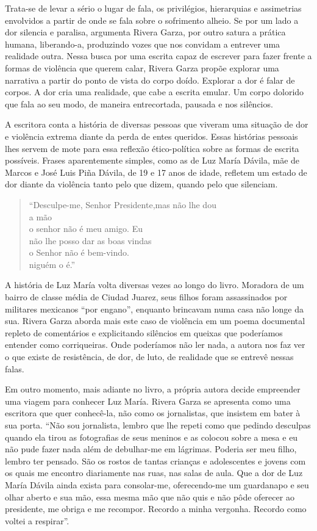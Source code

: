 Trata-se de levar a sério o lugar de fala, os privilégios, hierarquias e
assimetrias envolvidos a partir de onde se fala sobre o sofrimento
alheio. Se por um lado a dor silencia e paralisa, argumenta Rivera
Garza, por outro satura a prática humana, liberando-a, produzindo vozes
que nos convidam a entrever uma realidade outra. Nessa busca por uma
escrita capaz de escrever para fazer frente a formas de violência que
querem calar, Rivera Garza propõe explorar uma narrativa a partir do
ponto de vista do corpo doído. Explorar a dor é falar de corpos. A dor
cria uma realidade, que cabe a escrita emular. Um corpo dolorido que
fala ao seu modo, de maneira entrecortada, pausada e nos silêncios.

A escritora conta a história de diversas pessoas que viveram uma
situação de dor e violência extrema diante da perda de entes queridos.
Essas histórias pessoais lhes servem de mote para essa reflexão
ético-política sobre as formas de escrita possíveis. Frases
aparentemente simples, como as de Luz María Dávila, mãe de Marcos e José
Luis Piña Dávila, de 19 e 17 anos de idade, refletem um estado de dor
diante da violência tanto pelo que dizem, quando pelo que silenciam.

\begin{verse}
``Desculpe-me, Senhor Presidente,\qb{}mas não lhe dou\\
a mão\\
o senhor não é meu amigo. Eu\\
não lhe posso dar as boas vindas\\
o Senhor não é bem-vindo.\\
niguém o é.''
\end{verse}

A história de Luz María volta diversas vezes ao longo do livro. Moradora
de um bairro de classe média de Ciudad Juarez, seus filhos foram
assassinados por militares mexicanos ``por engano'', enquanto brincavam
numa casa não longe da sua. Rivera Garza aborda mais este caso de
violência em um poema documental repleto de comentários e explicitando
silêncios em queixas que poderíamos entender como corriqueiras. Onde
poderíamos não ler nada, a autora nos faz ver o que existe de
resistência, de dor, de luto, de realidade que se entrevê nessas falas.

Em outro momento, mais adiante no livro, a própria autora decide
empreender uma viagem para conhecer Luz María. Rivera Garza se apresenta
como uma escritora que quer conhecê-la, não como os jornalistas, que
insistem em bater à sua porta. ``Não sou jornalista, lembro que lhe
repeti como que pedindo desculpas quando ela tirou as fotografias de
seus meninos e as colocou sobre a mesa e eu não pude fazer nada além de
debulhar-me em lágrimas. Poderia ser meu filho, lembro ter pensado. São
os rostos de tantas crianças e adolescentes e jovens com os quais me
encontro diariamente nas ruas, nas salas de aula. Que a dor de Luz María
Dávila ainda exista para consolar-me, oferecendo-me um guardanapo e seu
olhar aberto e sua mão, essa mesma mão que não quis e não pôde oferecer
ao presidente, me obriga e me recompor. Recordo a minha vergonha.
Recordo como voltei a respirar''.

